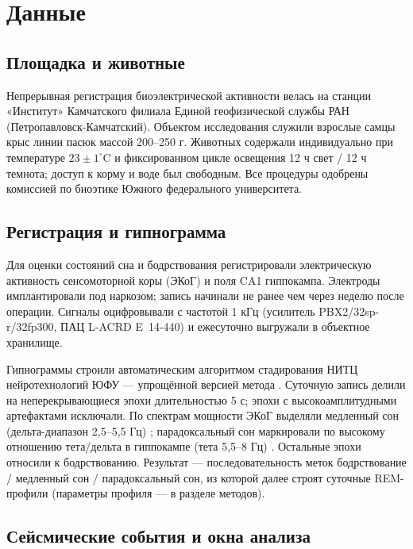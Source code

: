 \documentclass{article}
\begin{document}
\section{Данные}

\subsection{Площадка и животные}

Непрерывная регистрация биоэлектрической активности велась на станции «Институт» Камчатского филиала Единой геофизической службы РАН (Петропавловск-Камчатский). Объектом исследования служили взрослые самцы крыс линии пасюк массой 200–250 г. Животных содержали индивидуально при температуре \(23\pm 1^{\circ}\)C и фиксированном цикле освещения 12 ч свет / 12 ч темнота; доступ к корму и воде был свободным. Все процедуры одобрены комиссией по биоэтике Южного федерального университета.

\subsection{Регистрация и гипнограмма}

Для оценки состояний сна и бодрствования регистрировали электрическую активность сенсомоторной коры (ЭКоГ) и поля CA1 гиппокампа. Электроды имплантировали под наркозом; запись начинали не ранее чем через неделю после операции. Сигналы оцифровывали с частотой 1 кГц (усилитель PBX2/32sp-r/32fp300, ПАЦ L-ACRD E~14-440) и ежесуточно выгружали в объектное хранилище.

Гипнограммы строили автоматическим алгоритмом стадирования НИТЦ нейротехнологий ЮФУ — упрощённой версией метода \cite{Saevskiy2025}. Суточную запись делили на неперекрывающиеся эпохи длительностью 5 с; эпохи с высокоамплитудными артефактами исключали. По спектрам мощности ЭКоГ выделяли медленный сон (дельта-диапазон 2,5–5,5 Гц) \cite{Fang2010}; парадоксальный сон маркировали по высокому отношению тета/дельта в гиппокампе (тета 5,5–8 Гц) \cite{Fang2010,Saevskiy2025}. Остальные эпохи относили к бодрствованию. Результат — последовательность меток бодрствование / медленный сон / парадоксальный сон, из которой далее строят суточные REM-профили (параметры профиля — в разделе методов).

\subsection{Сейсмические события и окна анализа}
\end{document}
